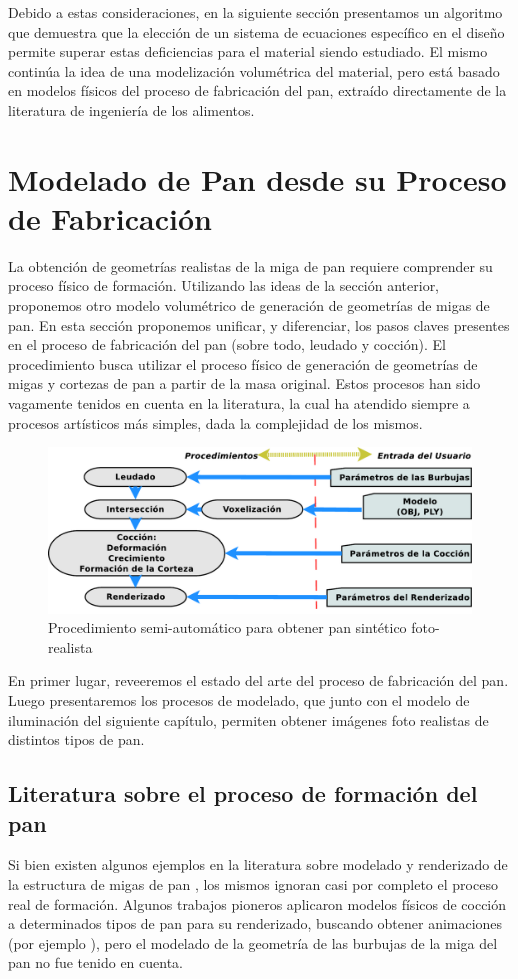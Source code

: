 Debido a estas consideraciones, en la siguiente sección presentamos un algoritmo que demuestra que la elección de un sistema de ecuaciones específico en el diseño permite superar estas deficiencias para el material siendo estudiado.
El mismo continúa la idea de una modelización volumétrica del material, pero está basado en modelos físicos del proceso de fabricación del pan, extraído directamente de la literatura de ingeniería de los alimentos.

\section{Modelado de Pan desde su Proceso de Fabricación}
La obtención de geometrías realistas de la miga de pan requiere comprender su proceso físico de formación.
Utilizando las ideas de la sección anterior, proponemos otro modelo volumétrico de generación de geometrías de migas de pan.
En esta sección proponemos unificar, y diferenciar, los pasos claves presentes en el proceso de fabricación del pan (sobre todo, leudado y cocción).
El procedimiento busca utilizar el proceso físico de generación de geometrías de migas y cortezas de pan a partir de la masa original.
Estos procesos han sido vagamente tenidos en cuenta en la literatura, la cual ha atendido siempre a procesos artísticos más simples, dada la complejidad de los mismos.


\begin{figure}
\includegraphics[width=13cm]{figures/pipeline}
\caption{Procedimiento semi-automático para obtener pan sintético foto-realista}
\label{FigPipeline}
\end{figure}


En primer lugar, reveeremos el estado del arte del proceso de fabricación del pan.
Luego presentaremos los procesos de modelado, que junto con el modelo de iluminación del siguiente capítulo, permiten obtener imágenes foto realistas de distintos tipos de pan.

\subsection{Literatura sobre el proceso de formación del pan}
Si bien existen algunos ejemplos en la literatura sobre modelado y renderizado de la estructura de migas de pan \cite{Tong2005,Xenakis2007}, los mismos ignoran casi por completo el proceso real de formación.
Algunos trabajos pioneros aplicaron modelos físicos de cocción a determinados tipos de pan para su renderizado, buscando obtener animaciones (por ejemplo \cite{Rodriguez-Arenas2011}), pero el modelado de la geometría de las burbujas de la miga del pan no fue tenido en cuenta.

